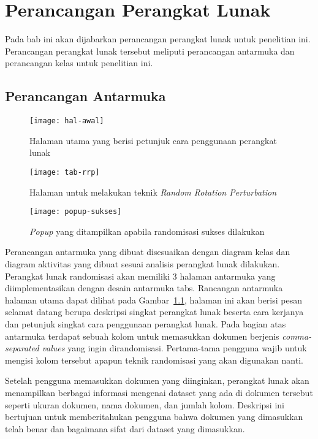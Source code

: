 \chapter{Perancangan Perangkat Lunak}
\label{chap:perancangan}

Pada bab ini akan dijabarkan perancangan perangkat lunak untuk penelitian ini. Perancangan perangkat lunak tersebut meliputi perancangan antarmuka dan perancangan kelas untuk penelitian ini.

\section{Perancangan Antarmuka}
\label{sec:antarmuka}

\begin{figure}
	\centering
	\texttt{[image: hal-awal]}
	\caption{Halaman utama yang berisi petunjuk cara penggunaan perangkat lunak}
	\label{fig:hal-awal}
\end{figure}

\begin{figure}
	\centering
	\texttt{[image: tab-rrp]}
	\caption{Halaman untuk melakukan teknik \textit{Random Rotation Perturbation}}
	\label{fig:tab-rrp}
\end{figure}

\begin{figure}
	\centering
	\texttt{[image: popup-sukses]}
	\caption{\textit{Popup} yang ditampilkan apabila randomisasi sukses dilakukan}
	\label{fig:popup-sukses}
\end{figure}

Perancangan antarmuka yang dibuat disesuaikan dengan diagram kelas dan diagram aktivitas yang dibuat sesuai analisis perangkat lunak dilakukan. Perangkat lunak randomisasi akan memiliki 3 halaman antarmuka yang diimplementasikan dengan desain antarmuka tabs. Rancangan antarmuka halaman utama dapat dilihat pada Gambar~\ref{fig:hal-awal}, halaman ini akan berisi pesan selamat datang berupa deskripsi singkat perangkat lunak beserta cara kerjanya dan petunjuk singkat cara penggunaan perangkat lunak. Pada bagian atas antarmuka terdapat sebuah kolom untuk memasukkan dokumen berjenis \textit{comma-separated values} yang ingin dirandomisasi. Pertama-tama pengguna wajib untuk mengisi kolom tersebut apapun teknik randomisasi yang akan digunakan nanti.

Setelah pengguna memasukkan dokumen yang diinginkan, perangkat lunak akan menampilkan berbagai informasi mengenai dataset yang ada di dokumen tersebut seperti ukuran dokumen, nama dokumen, dan jumlah kolom. Deskripsi ini bertujuan untuk memberitahukan pengguna bahwa dokumen yang dimasukkan telah benar dan bagaimana sifat dari dataset yang dimasukkan. 

